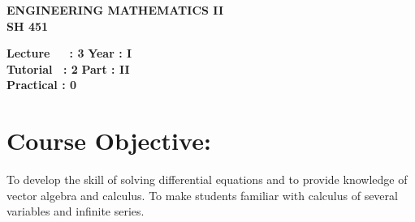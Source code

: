 \begin{center}
    \textbf{\huge{\uppercase{Engineering Mathematics II}}}
    \\
    \vspace{.5cm}
    \textbf{\large{SH 451}}
\end{center}

\noindent\textbf{Lecture\ \ \ : 3} \hfill \textbf{Year : I } \\
\textbf{Tutorial \ : 2} \hfill \textbf{Part : II } \\
\textbf{Practical : 0}  \\

\par
\noindent 
\section*{Course Objective:}
To develop the skill of solving differential equations and to provide knowledge of vector algebra and calculus. To make students familiar with calculus of several variables and infinite series.


